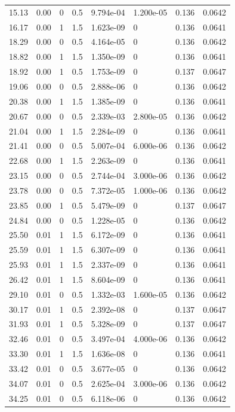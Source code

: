 \documentclass[preview]{standalone}
\begin{document}
{{\begin{tabular}{L{1.2cm}C{1.2cm} C{0.3cm}C{0.5cm} C{1.4cm}C{1.4cm} C{1.4cm}C{1.4cm}}
  15.13  &  0.00  & 0     & 0.5 &  9.794e-04  & 1.200e-05  & 0.136 &  0.0642   \\ 
  16.17  &  0.00  & 1     & 1.5 &  1.623e-09  & 0  & 0.136 &  0.0641   \\ 
  18.29  &  0.00  & 0     & 0.5 &  4.164e-05  & 0  & 0.136 &  0.0642   \\ 
  18.82  &  0.00  & 1     & 1.5 &  1.350e-09  & 0  & 0.136 &  0.0641   \\ 
  18.92  &  0.00  & 1     & 0.5 &  1.753e-09  & 0  & 0.137 &  0.0647   \\ 
  19.06  &  0.00  & 0     & 0.5 &  2.888e-06  & 0  & 0.136 &  0.0642   \\ 
  20.38  &  0.00  & 1     & 1.5 &  1.385e-09  & 0  & 0.136 &  0.0641   \\ 
  20.67  &  0.00  & 0     & 0.5 &  2.339e-03  & 2.800e-05  & 0.136 &  0.0642   \\ 
  21.04  &  0.00  & 1     & 1.5 &  2.284e-09  & 0  & 0.136 &  0.0641   \\ 
  21.41  &  0.00  & 0     & 0.5 &  5.007e-04  & 6.000e-06  & 0.136 &  0.0642   \\ 
  22.68  &  0.00  & 1     & 1.5 &  2.263e-09  & 0  & 0.136 &  0.0641   \\ 
  23.15  &  0.00  & 0     & 0.5 &  2.744e-04  & 3.000e-06  & 0.136 &  0.0642   \\ 
  23.78  &  0.00  & 0     & 0.5 &  7.372e-05  & 1.000e-06  & 0.136 &  0.0642   \\ 
  23.85  &  0.00  & 1     & 0.5 &  5.479e-09  & 0  & 0.137 &  0.0647   \\ 
  24.84  &  0.00  & 0     & 0.5 &  1.228e-05  & 0  & 0.136 &  0.0642   \\ 
  25.50  &  0.01  & 1     & 1.5 &  6.172e-09  & 0  & 0.136 &  0.0641   \\ 
  25.59  &  0.01  & 1     & 1.5 &  6.307e-09  & 0  & 0.136 &  0.0641   \\ 
  25.93  &  0.01  & 1     & 1.5 &  2.337e-09  & 0  & 0.136 &  0.0641   \\ 
  26.42  &  0.01  & 1     & 1.5 &  8.604e-09  & 0  & 0.136 &  0.0641   \\ 
  29.10  &  0.01  & 0     & 0.5 &  1.332e-03  & 1.600e-05  & 0.136 &  0.0642   \\ 
  30.17  &  0.01  & 1     & 0.5 &  2.392e-08  & 0  & 0.137 &  0.0647   \\ 
  31.93  &  0.01  & 1     & 0.5 &  5.328e-09  & 0  & 0.137 &  0.0647   \\ 
  32.46  &  0.01  & 0     & 0.5 &  3.497e-04  & 4.000e-06  & 0.136 &  0.0642   \\ 
  33.30  &  0.01  & 1     & 1.5 &  1.636e-08  & 0  & 0.136 &  0.0641   \\ 
  33.42  &  0.01  & 0     & 0.5 &  3.677e-05  & 0  & 0.136 &  0.0642   \\ 
  34.07  &  0.01  & 0     & 0.5 &  2.625e-04  & 3.000e-06  & 0.136 &  0.0642   \\ 
  34.25  &  0.01  & 0     & 0.5 &  6.118e-06  & 0  & 0.136 &  0.0642   \\ 
\hline 
\end{tabular} 

}}
\end{document}
